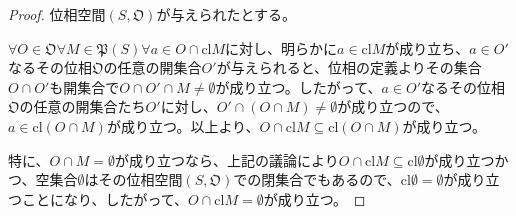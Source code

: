 \documentclass[dvipdfmx]{jsarticle}
\begin{document}
\begin{proof} 位相空間$\left( S,\mathfrak{O} \right)$が与えられたとする。\par
$\forall O \in \mathfrak{O\forall}M \in \mathfrak{P}(S)\forall a \in O \cap {\mathrm{cl}}M$に対し、明らかに$a \in {\mathrm{cl}}M$が成り立ち、$a \in O'$なるその位相$\mathfrak{O}$の任意の開集合$O'$が与えられると、位相の定義よりその集合$O \cap O'$も開集合で$O \cap O' \cap M \neq \emptyset$が成り立つ。したがって、$a \in O'$なるその位相$\mathfrak{O}$の任意の開集合たち$O'$に対し、$O' \cap (O \cap M) \neq \emptyset$が成り立つので、$a \in {\mathrm{cl}}(O \cap M)$が成り立つ。以上より、$O \cap {\mathrm{cl}}M \subseteq {\mathrm{cl}}(O \cap M)$が成り立つ。\par
特に、$O \cap M = \emptyset$が成り立つなら、上記の議論により$O \cap {\mathrm{cl}}M \subseteq {\mathrm{cl}}\emptyset$が成り立つかつ、空集合$\emptyset$はその位相空間$\left( S,\mathfrak{O} \right)$での閉集合でもあるので、${\mathrm{cl}}\emptyset = \emptyset$が成り立つことになり、したがって、$O \cap {\mathrm{cl}}M = \emptyset$が成り立つ。
\end{proof}
\end{document}

